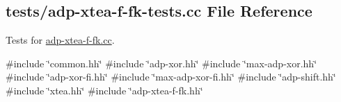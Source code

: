 \hypertarget{adp-xtea-f-fk-tests_8cc}{\subsection{tests/adp-\/xtea-\/f-\/fk-\/tests.cc \-File \-Reference}
\label{adp-xtea-f-fk-tests_8cc}
}


\-Tests for \hyperlink{adp-xtea-f-fk_8cc}{adp-\/xtea-\/f-\/fk.\-cc}.  


{\ttfamily \#include \char`\"{}common.\-hh\char`\"{}}\*
{\ttfamily \#include \char`\"{}adp-\/xor.\-hh\char`\"{}}\*
{\ttfamily \#include \char`\"{}max-\/adp-\/xor.\-hh\char`\"{}}\*
{\ttfamily \#include \char`\"{}adp-\/xor-\/fi.\-hh\char`\"{}}\*
{\ttfamily \#include \char`\"{}max-\/adp-\/xor-\/fi.\-hh\char`\"{}}\*
{\ttfamily \#include \char`\"{}adp-\/shift.\-hh\char`\"{}}\*
{\ttfamily \#include \char`\"{}xtea.\-hh\char`\"{}}\*
{\ttfamily \#include \char`\"{}adp-\/xtea-\/f-\/fk.\-hh\char`\"{}}\*
